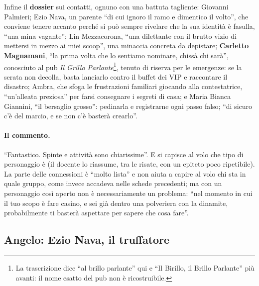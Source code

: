 Infine il \textbf{dossier} sui contatti, ognuno con una battuta tagliente: Giovanni
Palmieri; Ezio Nava, un parente ``di cui ignoro il ramo e dimentico il volto'', che
conviene tenere accanto perché si può sempre rivelare che la sua identità è
fasulla, ``una mina vagante''; Lin Mezzacorona, ``una dilettante con il brutto
vizio di mettersi in mezzo ai miei scoop'', una minaccia concreta da depistare;
\textbf{Carletto Magnamani}, ``la prima volta che lo sentiamo nominare, chissà chi
sarà'', conosciuto al pub \emph{Il Grillo Parlante}\footnote{La trascrizione dice
``al brillo parlante'' qui e ``Il Birillo, il Brillo Parlante'' più avanti: il nome
esatto del pub non è ricostruibile.}, tenuto di riserva per le emergenze: se la
serata non decolla, basta lanciarlo contro il buffet dei VIP e raccontare il
disastro; Ambra, che sfoga le frustrazioni familiari giocando alla contestatrice,
``un'alleata preziosa'' per farsi consegnare i segreti di casa; e Maria Bianca
Giannini, ``il bersaglio grosso'': pedinarla e registrarne ogni passo falso; ``di
sicuro c'è del marcio, e se non c'è basterà crearlo''.

\paragraph{Il commento.} ``Fantastico. Spinte e attività sono chiarissime''. E si
capisce al volo che tipo di personaggio è (il docente lo riassume, tra le risate,
con un epiteto poco ripetibile). La parte delle connessioni è ``molto lista'' e non
aiuta a capire al volo chi sta in quale gruppo, come invece accadeva nelle schede
precedenti; ma con un personaggio così aperto non è necessariamente un problema:
``nel momento in cui il tuo scopo è fare casino, e sei già dentro una polveriera con
la dinamite, probabilmente ti basterà aspettare per sapere che cosa fare''.

\subsection{Angelo: Ezio Nava, il truffatore}

